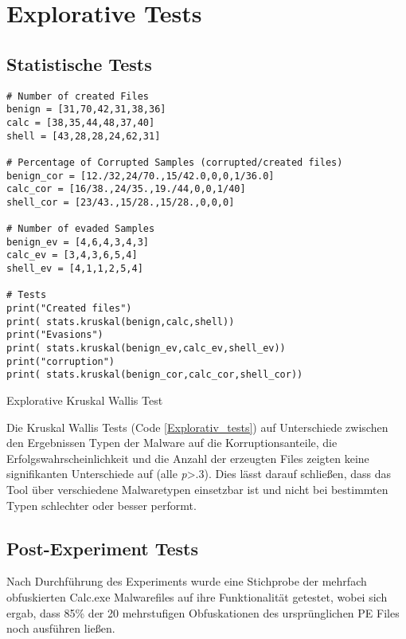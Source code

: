 \section{Explorative Tests}
\subsection{Statistische Tests}
\begin{listing}
   \begin{verbatim} 
# Number of created Files
benign = [31,70,42,31,38,36]
calc = [38,35,44,48,37,40]
shell = [43,28,28,24,62,31]

# Percentage of Corrupted Samples (corrupted/created files)
benign_cor = [12./32,24/70.,15/42.0,0,0,1/36.0]
calc_cor = [16/38.,24/35.,19./44,0,0,1/40]
shell_cor = [23/43.,15/28.,15/28.,0,0,0]

# Number of evaded Samples
benign_ev = [4,6,4,3,4,3]
calc_ev = [3,4,3,6,5,4]
shell_ev = [4,1,1,2,5,4]

# Tests
print("Created files")
print( stats.kruskal(benign,calc,shell))
print("Evasions")
print( stats.kruskal(benign_ev,calc_ev,shell_ev))
print("corruption")
print( stats.kruskal(benign_cor,calc_cor,shell_cor))
   \end{verbatim}
   \caption{Explorative Kruskal Wallis Test}
   \label{Explorativ_tests}
\end{listing}

Die Kruskal Wallis Tests (Code \ref{Explorativ_tests}) auf Unterschiede zwischen den  Ergebnissen Typen der Malware auf die Korruptionsanteile, die Erfolgswahrscheinlichkeit und die Anzahl der erzeugten Files zeigten keine signifikanten Unterschiede auf (alle \textit{p}>.3). Dies lässt darauf schließen, dass das Tool über verschiedene Malwaretypen einsetzbar ist und nicht bei bestimmten Typen schlechter oder besser performt.

\subsection{Post-Experiment Tests}
Nach Durchführung des Experiments wurde eine Stichprobe der mehrfach obfuskierten Calc.exe Malwarefiles auf ihre Funktionalität getestet, wobei sich ergab, dass 85\% der 20 mehrstufigen Obfuskationen des ursprünglichen PE Files noch ausführen ließen. 

